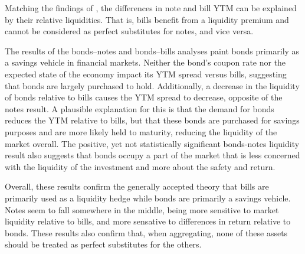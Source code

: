 \documentclass[11pt,a4paper,margin=1.5in]{article}
\begin{document}
Matching the findings of \citet{Amihud-Mendelson:1991}, the differences in note and bill YTM can be explained by their relative liquidities.
That is, bills benefit from a liquidity premium and cannot be considered as perfect substitutes for notes, and vice versa.

The results of the bonds--notes and bonds--bills analyses paint bonds primarily as a savings vehicle in financial markets. 
Neither the bond's coupon rate nor the expected state of the economy impact its YTM spread versus bills, suggesting that bonds are largely purchased to hold.
Additionally, a decrease in the liquidity of bonds relative to bills causes the YTM spread to decrease, opposite of the notes result. 
A plausible explanation for this is that the demand for bonds reduces the YTM relative to bills, but that these bonds are purchased for savings purposes and are more likely held to maturity, reducing the liquidity of the market overall.
The positive, yet not statistically significant bonds-notes liquidity result also suggests that bonds occupy a part of the market that is less concerned with the liquidity of the investment and more about the safety and return.


Overall, these results confirm the generally accepted theory that bills are primarily used as a liquidity hedge while bonds are primarily a savings vehicle.
Notes seem to fall somewhere in the middle, being more sensitive to market liquidity relative to bills, and more sensative to differences in return relative to bonds.
These results also confirm that, when aggregating, none of these assets should be treated as perfect substitutes for the others.

\end{document}

